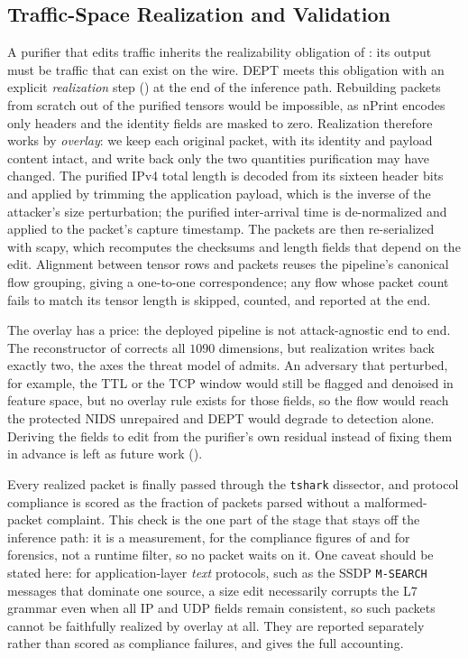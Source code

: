 \subsection{Traffic-Space Realization and Validation}\label{subsec:sol-realization}
A purifier that edits traffic inherits the realizability obligation of
: its output must be traffic that can exist on the wire.
DEPT meets this obligation with an explicit \emph{realization} step
() at the end of the inference path. Rebuilding packets from
scratch out of the purified tensors would be impossible, as nPrint encodes only headers and the
identity fields are masked to zero. Realization therefore works by \emph{overlay}: we
keep each original packet, with its identity and payload content intact,
and write back only the two quantities purification may have changed. The purified
IPv4 total length is decoded from its sixteen header bits and applied by trimming the application payload, which
is the inverse of the attacker's size perturbation; the purified inter-arrival time is
de-normalized and applied to the packet's capture timestamp. The packets are then
re-serialized with scapy, which recomputes the checksums and length fields that depend
on the edit. Alignment between tensor rows and packets reuses the pipeline's canonical
flow grouping, giving a one-to-one correspondence; any flow whose packet count fails to
match its tensor length is skipped, counted, and reported at the end.

The overlay has a price: the deployed pipeline is not attack-agnostic end to end. The
reconstructor of  corrects all $1090$ dimensions, but
realization writes back exactly two, the axes the threat model of 
admits. An adversary that perturbed, for example, the \ac{TTL} or the TCP window would
still be flagged and denoised in feature space, but no overlay rule exists for those
fields, so the flow would reach the protected \ac{NIDS} unrepaired and DEPT would
degrade to detection alone. Deriving the fields to edit from the purifier's own residual
instead of fixing them in advance is left as future work ().

Every realized packet is finally passed through the \texttt{tshark} dissector, and
protocol compliance is scored as the fraction of packets parsed without a
malformed-packet complaint. This check is the one part of the stage that stays off the
inference path: it is a measurement, for the compliance figures of
 and for forensics, not a runtime filter, so no packet waits
on it. One caveat should be stated here: for
application-layer \emph{text} protocols, such as the SSDP \texttt{M-SEARCH} messages
that dominate one source, a size edit necessarily corrupts the L7 grammar
even when all IP and UDP fields remain consistent, so such packets cannot be faithfully
realized by overlay at all. They are reported separately rather than scored as
compliance failures, and  gives the full accounting.

